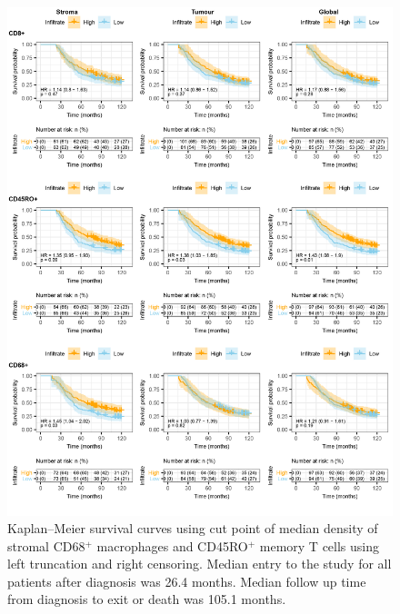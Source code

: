\begin{figure}
    \centering
    \includegraphics{Chapter2/Figs/Raster/KM_allinf.png}
    \caption[KM Survival curves for individual infiltrates]{Kaplan–Meier survival curves using cut point of median density of stromal CD68$^+$ macrophages and CD45RO$^+$ memory T cells using left truncation and right censoring. Median entry to the study for all patients after diagnosis was 26.4 months. Median follow up time from diagnosis to exit or death was 105.1 months.}
    \label{fig:KM_infiltrates}
\end{figure}


